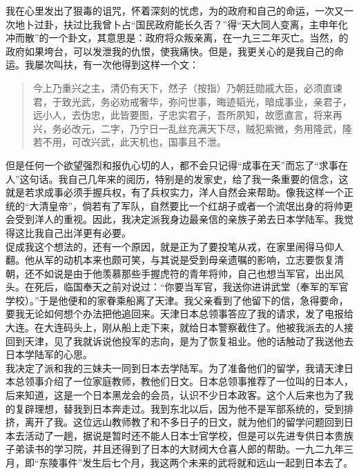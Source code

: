 我在心里发出了狠毒的诅咒，怀着深刻的忧虑，为的政府和自己的命运，一次又一次地卜过卦，扶过比我曾卜占“国民政府能长久否？”得“天大同人变离，主申年化冲而散”的一个卦文，其意思是：政府将众叛亲离，在一九三二年灭亡。当然，的政府如果垮台，可以发泄我的仇恨，使我痛快。但是，我更关心的是我自己的命运。我屡次叫扶，有一次他得到这样一个文：\\

\begin{quote}
	今上乃重兴之主，清仍有天下，然子（按指）乃朝廷勋戚大臣，必须直谏君，于致光武，务必劝戒奢华，弥问世事，晦迹韬光，暗成事业，亲君子，远小人，去伪忠，此皆要图，子忠实君子，吾所夙知，故愿直言，将来再兴，务必改元，二字，乃宁日一乱丝充满天下尽，贼犯紫微，务用隆武，隆若不用，可改兴武，此天机也，国事且不泄。\\
\end{quote}

但是任何一个欲望强烈和报仇心切的人，都不会只记得“成事在天”而忘了“求事在人”这句话。我自己几年来的阅历，特别是的发家史，给了我一条重要的信念，这就是若求成事必须手握兵权，有了兵权实力，洋人自然会来帮助。像我这样一个正统的“大清皇帝”，倘若有了军队，自然要比一个红胡子或者一个流氓出身的将帅更会受到洋人的重视。因此，我决定派我身边最亲信的亲族子弟去日本学陆军。我觉得这比我自己出洋更有必要。\\

促成我这个想法的，还有一个原因，就是正为了要投笔从戎，在家里闹得马仰人翻。他从军的动机本来也颇可笑，与其说是受到母亲遗嘱的影响，立志要恢复清朝，还不如说是由于他羡慕那些手握虎符的青年将帅，自己也想当军官，出出风头。在死后，临国奉天之前对说过：“你要当军官，我送你进讲武堂（奉军的军官学校）。”于是他便和的家眷乘船离了天津。我父亲看到了他留下的信，急得要命，要我无论如何想个办法把他追回来。天津日本总领事答应了我的请求，发了电报给大连。在大连码头上，刚从船上走下来，就给日本警察截住了。他被我派去的人接回到天津，见了我就诉说他投军的志向，是为了恢复祖业。他的话触动了我送他去日本学陆军的心思。\\

我决定了派和我的三妹夫一同到日本去学陆军。为了准备他们的留学，我请天津日本总领事介绍了一位家庭教师，教他们日文。日本总领事推荐了一位叫的日本人，后来知道，这是一个日本黑龙会的会员，认识不少日本政客。这个人后来也为了我的复辟理想，替我到日本奔走过。我到东北以后，因为他不是军部系统的，受到排挤，离开了我。这位远山教师教了和不多日子的日文，就为他们的留学问题回到日本去活动了一趟，据说是暂时还不能人日本士官学校，但是可以先进专供日本贵族子弟读书的学习院，并且还得到了日本的大财阀大仓喜人郎的帮助。一九二九年三月，即“东陵事件”发生后七个月，我这两个未来的武将就和远山一起到日本去了。
